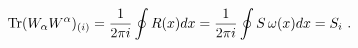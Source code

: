 \begin{equation}
{\rm Tr}(W_{\alpha}W^{\alpha})_{(i)}=
\frac{1}{2\pi i} \oint R(x) dx =\frac{1}{2\pi i} \oint S \, \omega(x) dx=
S_i\ . 
\label{R}
\end{equation}

